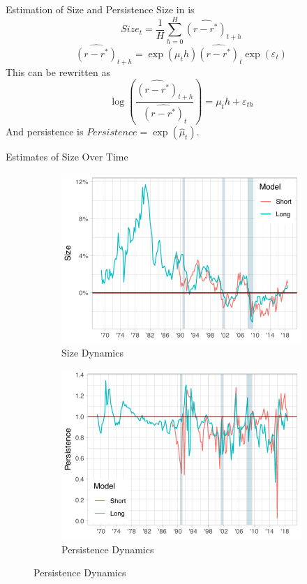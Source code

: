 \documentclass[10pt,aspectratio=169]{beamer}
\begin{document}
\begin{frame}{Estimation of Size and Persistence}
Size in \cite{KMV2018} is 
\[\mathit{Size}_t=\frac{1}{H}\sum_{h=0}^H \widehat{\left(r-r^*\right)}_{t+h}\]
\[\widehat{\left(r-r^*\right)}_{t+h}=\exp(\mu_t h)\widehat{\left(r-r^*\right)}_t\exp(\varepsilon_t)\]
This can be rewritten as 
\[\log\left(\frac{\widehat{\left(r-r^*\right)}_{t+h}}{\widehat{\left(r-r^*\right)}_{t}}\right)=\mu_t h+\varepsilon_{th}\]
And persistence is $\mathit{Persistence}=\exp(\hat{\mu}_t)$.
\end{frame}


\begin{frame}{Estimates of Size Over Time}
    \begin{figure}[!htbp]\centering
        \caption{}
        \label{fig:Size_Persistence_Dynamics}
        \begin{subfigure}[b]{0.49\textwidth}\centering
            \caption{Size Dynamics}
            \label{fig:AverageResponce}
            \includegraphics[width=\linewidth]{size_plot.pdf}
        \end{subfigure}%
        \begin{subfigure}[b]{0.49\textwidth}\centering
            \caption{Persistence Dynamics}
            \label{fig:DifferentialResponce}
            \includegraphics[width=\linewidth]{persistence_plot.pdf}

\end{subfigure}
\end{figure}
\end{frame}
\end{document}
